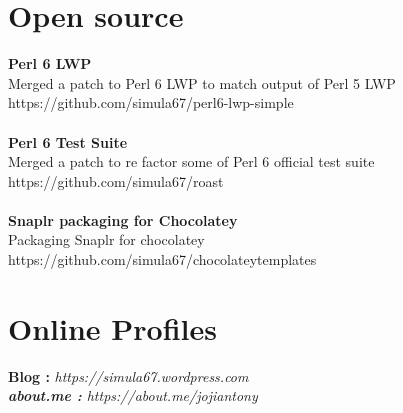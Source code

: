 \documentclass[line,margin]{res}
\begin{document}
\begin{resume}
\section{Open source}
{\bf Perl 6 LWP}\\
Merged a patch to Perl 6 LWP to match output of Perl 5 LWP\\
https://github.com/simula67/perl6-lwp-simple\\ \\
{\bf Perl 6 Test Suite}\\
Merged a patch to re factor some of Perl 6 official test suite\\
https://github.com/simula67/roast\\ \\
{\bf Snaplr packaging for Chocolatey}\\
Packaging Snaplr for chocolatey\\
https://github.com/simula67/chocolateytemplates\\

\section{Online Profiles}
{\bf Blog :} \it{https://simula67.wordpress.com} \\
{\bf about.me :} \it{https://about.me/jojiantony} \\


\end{resume}
\end{document}

